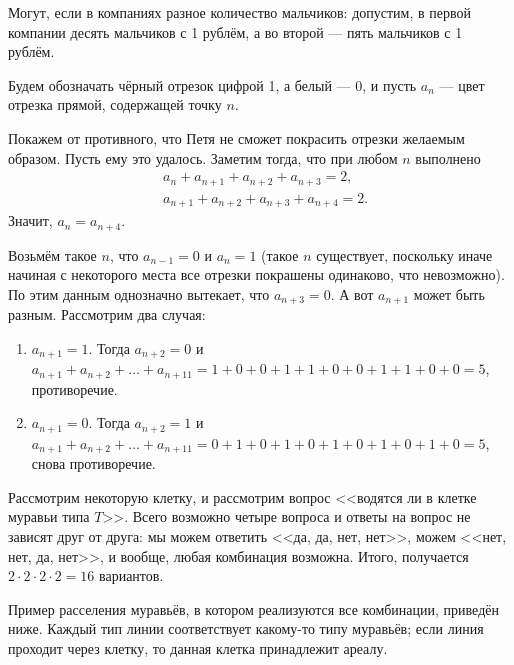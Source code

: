 \begin{itemize}
\itA Могут, если в компаниях разное количество мальчиков: допустим, в первой компании десять мальчиков с 1 рублём, а во второй --- пять мальчиков с 1 рублём.

\itB 

Будем обозначать чёрный отрезок цифрой 1, а белый --- 0, и пусть $a_n$ --- цвет отрезка прямой, содержащей
точку $n$.

Покажем от противного, что Петя не сможет покрасить отрезки желаемым образом.
Пусть ему это удалось.
Заметим тогда, что при любом $n$ выполнено
\begin{align*}
	& a_n+a_{n+1}+a_{n+2}+a_{n+3} = 2, \\
	& a_{n+1}+a_{n+2}+a_{n+3}+a_{n+4} = 2.
\end{align*}
Значит, $a_n = a_{n+4}$. 

Возьмём такое $n$, что $a_{n-1} = 0$ и $a_n = 1$ (такое $n$ существует, поскольку иначе
начиная с некоторого места все отрезки покрашены одинаково, что невозможно). 
По этим данным однозначно вытекает, что $a_{n+3} = 0$. А вот $a_{n+1}$ может быть
разным.
Рассмотрим два случая: 

\begin{enumerate}
\item $a_{n+1} = 1$. Тогда $a_{n+2} = 0$ и
$a_{n+1} + a_{n+2} + \dots + a_{n+11} = 1 + 0 + 0 + 1 + 1 + 0 + 0 + 1 + 1 + 0 + 0 = 5$,
противоречие.

\item $a_{n+1} = 0$. Тогда $a_{n+2} = 1$ и
$a_{n+1} + a_{n+2} + \dots + a_{n+11} = 0 + 1 + 0 + 1 + 0 + 1 + 0 + 1 + 0 + 1 + 0 = 5$,
снова противоречие.
\end{enumerate}

\itC Рассмотрим некоторую клетку, и рассмотрим вопрос <<водятся ли в клетке муравьи типа $T$>>.
Всего возможно четыре вопроса и ответы на вопрос не зависят друг от друга:
мы можем ответить <<да, да, нет, нет>>, можем <<нет, нет, да, нет>>, и вообще, 
любая комбинация возможна. 
Итого, получается $2 \cdot 2 \cdot 2 \cdot 2 = 16$ вариантов. 

Пример расселения муравьёв, в котором реализуются все комбинации, приведён ниже.
Каждый тип линии соответствует какому-то типу муравьёв; если линия проходит
через клетку, то данная клетка принадлежит ареалу.

\begin{center}
\end{center}
\end{itemize}
